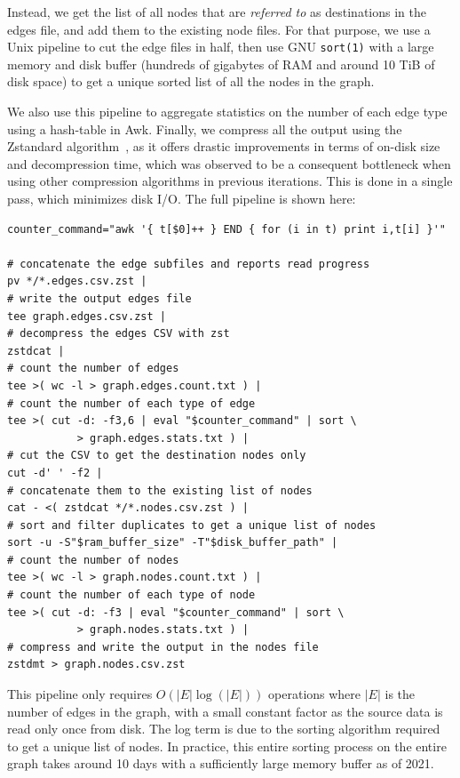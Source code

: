 Instead, we get the list of all nodes that are \emph{referred to} as
destinations in the edges file, and add them to the existing node files. For
that purpose, we use a Unix pipeline to cut the edge files in half, then use
GNU \texttt{sort(1)} with a large memory and disk buffer (hundreds of gigabytes
of RAM and around 10 TiB of disk space) to get a unique sorted list of all the
nodes in the graph.

We also use this pipeline to aggregate statistics on the number of each edge
type using a hash-table in Awk. Finally, we compress all the output using the
Zstandard algorithm~\cite{collet2015zstd}, as it offers drastic improvements in
terms of on-disk size and decompression time, which was observed to be a
consequent bottleneck when using other compression algorithms in previous
iterations. This is done in a single pass, which minimizes disk I/O. The full
pipeline is shown here:

\begin{verbatim}
counter_command="awk '{ t[$0]++ } END { for (i in t) print i,t[i] }'"

# concatenate the edge subfiles and reports read progress
pv */*.edges.csv.zst |
# write the output edges file
tee graph.edges.csv.zst |
# decompress the edges CSV with zst
zstdcat |
# count the number of edges
tee >( wc -l > graph.edges.count.txt ) |
# count the number of each type of edge
tee >( cut -d: -f3,6 | eval "$counter_command" | sort \
           > graph.edges.stats.txt ) |
# cut the CSV to get the destination nodes only
cut -d' ' -f2 |
# concatenate them to the existing list of nodes
cat - <( zstdcat */*.nodes.csv.zst ) |
# sort and filter duplicates to get a unique list of nodes
sort -u -S"$ram_buffer_size" -T"$disk_buffer_path" |
# count the number of nodes
tee >( wc -l > graph.nodes.count.txt ) |
# count the number of each type of node
tee >( cut -d: -f3 | eval "$counter_command" | sort \
           > graph.nodes.stats.txt ) |
# compress and write the output in the nodes file
zstdmt > graph.nodes.csv.zst
\end{verbatim}

This pipeline only requires $O(|E| \log(|E|))$ operations where $|E|$ is the
number of edges in the graph, with a small constant factor as the source data
is read only once from disk. The log term is due to the sorting algorithm
required to get a unique list of nodes. In practice, this entire sorting
process on the entire graph takes around 10 days with a sufficiently large
memory buffer as of 2021.

